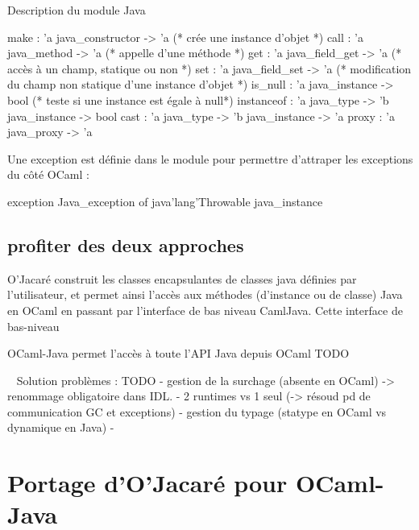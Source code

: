 \documentclass[a4paper, 11pt, notitlepage]{article}
\begin{document}
\noindent
Description du module Java

\begin{OCamlEx}
make : 'a java_constructor -> 'a (* crée une instance d'objet *)
call : 'a java_method -> 'a (* appelle d'une méthode *)
get : 'a java_field_get -> 'a (* accès à un champ, statique ou non *)
set : 'a java_field_set -> 'a (* modification du champ non statique
d'une instance d'objet *)
is_null : 'a java_instance -> bool (* teste si une instance est égale à null*)
instanceof : 'a java_type -> 'b java_instance -> bool
cast : 'a java_type -> 'b java_instance -> 'a
proxy : 'a java_proxy -> 'a
\end{OCamlEx}
Une exception est définie dans le module pour permettre d'attraper les
exceptions du côté OCaml :
\begin{OCamlEx}
exception Java_exception of java'lang'Throwable java_instance
\end{OCamlEx}




\subsection{profiter des deux approches}
O'Jacaré construit les classes encapsulantes de classes
java définies par l'utilisateur, et permet ainsi l'accès aux méthodes
(d'instance ou de classe) Java en OCaml en passant par l'interface de bas niveau CamlJava.
Cette interface de bas-niveau 

OCaml-Java permet l'accès à toute l'API Java depuis OCaml TODO


\ 
\newline
Solution problèmes : TODO
- gestion de la surchage (absente en OCaml) -> renommage obligatoire
dans IDL.
- 2 runtimes vs 1 seul (-> résoud pd de communication GC et exceptions)
- gestion du typage (statype en OCaml vs dynamique en Java)
-










\section{Portage d'O'Jacaré pour OCaml-Java}
\end{document}

